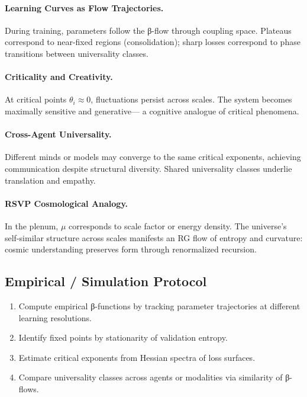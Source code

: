 \documentclass[12pt,a4paper,twoside,openright]{book}
\begin{document}
\paragraph{Learning Curves as Flow Trajectories.}
During training, parameters follow the β-flow through coupling space.
Plateaus correspond to near-fixed regions (consolidation);
sharp losses correspond to phase transitions between universality classes.

\paragraph{Criticality and Creativity.}
At critical points $\theta_i\approx0$,
fluctuations persist across scales.
The system becomes maximally sensitive and generative—
a cognitive analogue of critical phenomena.

\paragraph{Cross-Agent Universality.}
Different minds or models may converge to the same critical exponents,
achieving communication despite structural diversity.
Shared universality classes underlie translation and empathy.

\paragraph{RSVP Cosmological Analogy.}
In the plenum, $\mu$ corresponds to scale factor or energy density.
The universe’s self-similar structure across scales
manifests an RG flow of entropy and curvature:
cosmic understanding preserves form through renormalized recursion.

\subsection*{Empirical / Simulation Protocol}

\begin{enumerate}
\item Compute empirical β-functions by tracking parameter trajectories
at different learning resolutions.
\item Identify fixed points by stationarity of validation entropy.
\item Estimate critical exponents from Hessian spectra of loss surfaces.
\item Compare universality classes across agents or modalities
via similarity of β-flows.
\end{enumerate}
\end{document}
